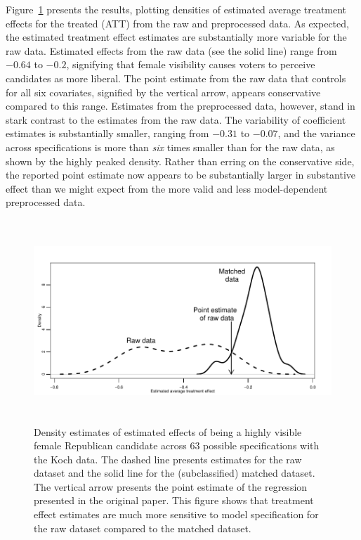 \documentclass[11pt,titlepage]{article}
\begin{document}
Figure~\ref{fg:kochdens} presents the results, plotting densities of
estimated average treatment effects for the treated (ATT) from the raw
and preprocessed data.  As expected, the estimated treatment effect
estimates are substantially more variable for the raw data.  Estimated
effects from the raw data (see the solid line) range from $-0.64$ to
$-0.2$, signifying that female visibility causes voters to perceive
candidates as more liberal.  The point estimate from the raw data that
controls for all six covariates, signified by the vertical arrow,
appears conservative compared to this range.  Estimates from the
preprocessed data, however, stand in stark contrast to the estimates
from the raw data.  The variability of coefficient estimates is
substantially smaller, ranging from $-0.31$ to $-0.07$, and the
variance across specifications is more than \emph{six} times smaller
than for the raw data, as shown by the highly peaked density.  Rather
than erring on the conservative side, the reported point estimate now
appears to be substantially larger in substantive effect than we might
expect from the more valid and less model-dependent preprocessed data.
\begin{figure}[t] 
 \begin{center}
   \includegraphics[height=3in,angle=0]{figs/kochdens.pdf}
 \end{center} 
 \vspace{-0.275in}
 \caption{Density estimates of estimated effects of
   being a highly visible female Republican candidate across 63
   possible specifications with the Koch data.  The dashed line
   presents estimates for the raw dataset and the solid line for the
   (subclassified) matched dataset.  The vertical arrow presents the
   point estimate of the regression presented in the original paper.
   This figure shows that treatment effect estimates are much more
   sensitive to model specification for the raw dataset compared to
   the matched dataset.}
 \label{fg:kochdens}
\end{figure}
\end{document}
